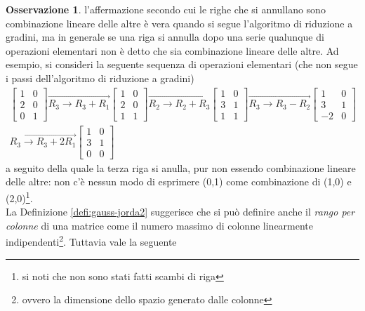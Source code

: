 \documentclass{book}
\theoremstyle{definition}
\newtheorem{oss}{Osservazione}[section]
\theoremstyle{plain}
\begin{document}
\begin{oss}
  \label{oss:gauss-jorda3}
  l'affermazione secondo cui le righe che si annullano sono combinazione
  lineare delle altre è vera quando si segue l'algoritmo di riduzione
  a gradini, ma in generale se una riga si annulla dopo una serie
  qualunque di operazioni elementari non è detto che sia combinazione
  lineare delle altre. Ad esempio, si consideri la seguente sequenza di
  operazioni elementari (che non segue i passi dell'algoritmo di
  riduzione a gradini)
  \begin{eqnarray*}
    \begin{bmatrix}
      1 & 0\\
      2 & 0\\
      0 & 1
    \end{bmatrix} \overrightarrow{
      R_3\to R_3+R_1
    }
    \begin{bmatrix}
      1 & 0 \\
      2 & 0 \\
      1 & 1
    \end{bmatrix}
    \overrightarrow{R_2\to R_2+R_3}
    \begin{bmatrix}
      1 & 0\\
      3 & 1\\
      1 & 1
    \end{bmatrix}\overrightarrow{R_3\to R_3-R_2}
    \begin{bmatrix}
      1 & 0 \\
      3 & 1 \\
      -2 & 0
    \end{bmatrix}\\
    \overrightarrow{R_3\to R_3+2R_1}
    \begin{bmatrix}
      1 & 0\\
      3 & 1\\
      0 & 0
    \end{bmatrix}
  \end{eqnarray*}
  a seguito della quale la terza riga si anulla, pur non essendo
  combinazione lineare delle altre: non c'è nessun modo di esprimere
  (0,1) come combinazione di (1,0) e (2,0)\footnote{si noti che non sono
    stati fatti scambi di riga}.\\
  La Definizione \ref{defi:gauss-jorda2} suggerisce che si può definire
  anche il \textit{rango per colonne} di una matrice come il numero
  massimo di colonne linearmente indipendenti\footnote{ovvero la
    dimensione dello spazio generato dalle colonne}. Tuttavia vale la
  seguente
\end{oss}
\end{document}
